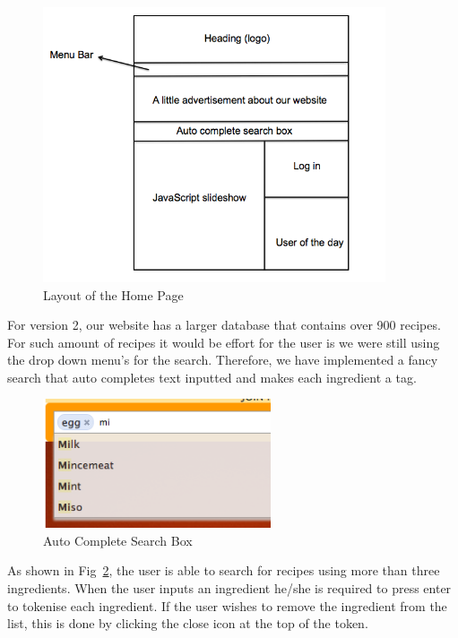 \begin{figure}[h]
\begin{center}
\includegraphics[width=0.9\textwidth]{home_page_v2}
\caption{Layout of the Home Page}
\label{fig:home_page}
\end{center}
\end{figure}

For version 2, our website has a larger database that contains over 900 recipes. For such amount of recipes it would be effort for the user is we were still using the drop down menu's for the search. Therefore, we have implemented a fancy search that auto completes text inputted and makes each ingredient a tag. 

\begin{figure}[h]
\begin{center}
\includegraphics[width=0.6\textwidth]{auto_complete}
\caption{Auto Complete Search Box}
\label{fig:auto_complete}
\end{center}
\end{figure}

As shown in Fig~\ref{fig:auto_complete}, the user is able to search for recipes using more than three ingredients. When the user inputs an ingredient he/she is required to press enter to tokenise each ingredient. If the user wishes to remove the ingredient from the list, this is done by clicking the close icon at the top of the token. 

